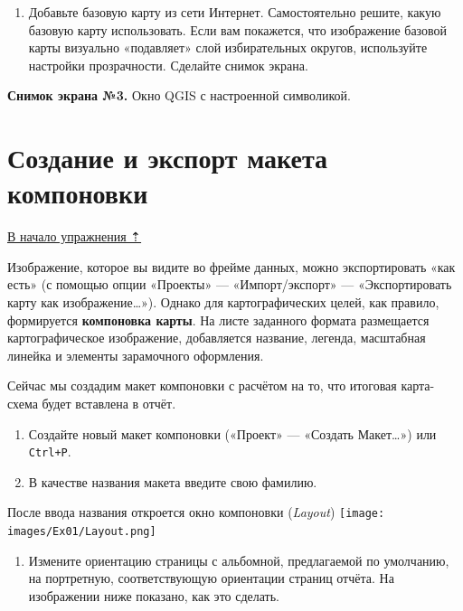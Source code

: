 \documentclass[
  12pt,
]{book}
\providecommand{\tightlist}{%
  \setlength{\itemsep}{0pt}\setlength{\parskip}{0pt}}
\begin{document}
\begin{enumerate}
\def\labelenumi{\arabic{enumi}.}
\setcounter{enumi}{10}
\tightlist
\item
  Добавьте базовую карту из сети Интернет. Самостоятельно решите, какую базовую карту использовать. Если вам покажется, что изображение базовой карты визуально «подавляет» слой избирательных округов, используйте настройки прозрачности. Сделайте снимок экрана.
\end{enumerate}

\textbf{Снимок экрана №3.} Окно QGIS с настроенной символикой.

\hypertarget{digitizing-layout}{%
\section{Создание и экспорт макета компоновки}\label{digitizing-layout}}

\protect\hyperlink{digitizing-districts}{В начало упражнения ⇡}

Изображение, которое вы видите во фрейме данных, можно экспортировать «как есть» (с помощью опции «Проекты» --- «Импорт/экспорт» --- «Экспортировать карту как изображение\ldots»). Однако для картографических целей, как правило, формируется \textbf{компоновка карты}. На листе заданного формата размещается картографическое изображение, добавляется название, легенда, масштабная линейка и элементы зарамочного оформления.

Сейчас мы создадим макет компоновки с расчётом на то, что итоговая карта-схема будет вставлена в отчёт.

\begin{enumerate}
\def\labelenumi{\arabic{enumi}.}
\item
  Создайте новый макет компоновки («Проект» --- «Создать Макет\ldots») или \texttt{Ctrl+P}.
\item
  В качестве названия макета введите свою фамилию.
\end{enumerate}

После ввода названия откроется окно компоновки (\emph{Layout}) \texttt{[image: images/Ex01/Layout.png]}

\begin{enumerate}
\def\labelenumi{\arabic{enumi}.}
\setcounter{enumi}{2}
\tightlist
\item
  Измените ориентацию страницы с альбомной, предлагаемой по умолчанию, на портретную, соответствующую ориентации страниц отчёта. На изображении ниже показано, как это сделать.
\end{enumerate}
\end{document}
